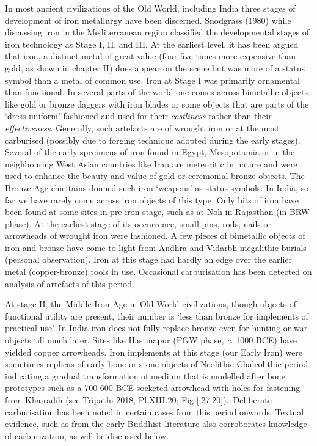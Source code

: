 In most ancient civilizations of the Old World, including India three stages of development of iron metallurgy have been discerned. Snodgrass (1980) while discussing iron in the Mediterranean region classified the developmental stages of iron technology as Stage I, II, and III.  At the earliest level, it has been argued that iron, a distinct metal of great value (four-five times more expensive than gold, as shown in chapter II) does appear on the scene but was more of a status symbol than a metal of common use. Iron at Stage I was primarily ornamental than functional. In several parts of the world one comes across bimetallic objects like gold or bronze daggers with iron blades or some objects that are parts of the ‘dress uniform’ fashioned and used for their {\it costliness} rather than their {\it effectiveness}. Generally, such artefacts are of wrought iron or at the most carburised (possibly due to forging technique adopted during the early stages). Several of the early specimens of iron found in Egypt, Mesopotamia or in the neighbouring West Asian countries like Iran are meteoritic in nature and were used to enhance the beauty and value of gold or ceremonial bronze objects. The Bronze Age chieftains donned such iron ‘weapons’ as status symbols. In India, so far we have rarely come across iron objects of this type. Only bits of iron have been found at some sites in pre-iron stage, such as at Noh in Rajasthan (in BRW phase). At the earliest stage of its occurrence, small pins, rods, nails or arrowheads of wrought iron were fashioned. A few pieces of bimetallic objects of iron and bronze have come to light from Andhra and Vidarbh megalithic burials (personal observation). Iron at this stage had hardly an edge over the earlier metal (copper-bronze) tools in use. Occasional carburisation has been detected on analysis of artefacts of this period.

At stage II, the Middle Iron Age in Old World civilizations, though objects of functional utility are present, their number is ‘less than bronze for implements of practical use’. In India iron does not fully replace bronze even for hunting or war objects till much later. Sites like Hastinapur (PGW phase, {\it  c}. 1000 BCE) have yielded copper arrowheads. Iron implements at this stage (our Early Iron) were sometimes replicas of early bone or stone objects of Neolithic-Chalcolithic period indicating a gradual transformation of medium that is modelled after bone prototypes such as a 700-600 BCE socketed arrowhead with holes for fastening from Khairadih (see Tripathi 2018, Pl.XIII.20; Fig \ref{.27.20}).~Deliberate carburisation has been noted in certain cases from this period onwards. Textual evidence, such as from the early Buddhist literature also corroborates knowledge of carburization, as will be discussed below. 

